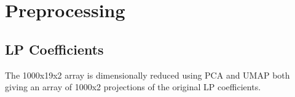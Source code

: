 \section{Preprocessing}

	\subsection{LP Coefficients}
		The 1000x19x2 array is dimensionally reduced using PCA and UMAP both giving an array of 1000x2 projections of the original LP coefficients.